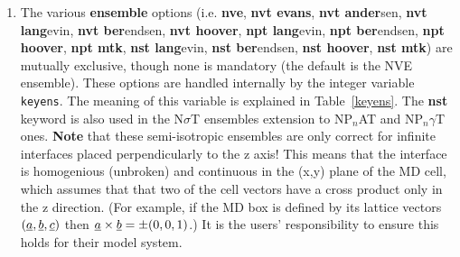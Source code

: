 \begin{enumerate}
\item The various {\bf ensemble} options (i.e.
{\bf nve},
{\bf nvt evans},
{\bf nvt ander}sen,
{\bf nvt lang}evin,
{\bf nvt ber}endsen,
{\bf nvt hoover},
{\bf npt lang}evin,
{\bf npt ber}endsen,
{\bf npt hoover},
{\bf npt mtk},
{\bf nst lang}evin,
{\bf nst ber}endsen,
{\bf nst hoover},
{\bf nst mtk})
are mutually exclusive, though none is mandatory (the default is
the NVE ensemble).  These options are handled
internally by the integer variable {\tt keyens}.  The meaning of
this variable is explained in Table~\ref{keyens}.  The {\bf nst}
keyword is also used in the N$\sigma$T ensembles extension to
NP$_{n}$AT and NP$_{n}\gamma$T ones.  {\bf Note} that
these semi-isotropic ensembles are only correct for infinite
interfaces placed perpendicularly to the z axis!  This means
that the interface is homogenious (unbroken) and continuous
in the (x,y) plane of the MD cell, which assumes that that two
of the cell vectors have a cross product only in the z
direction.  (For example, if the MD box is defined by
its lattice vectors $(\mbox{$\underline{a}$},\mbox{$\underline{b}$},\mbox{$\underline{c}$})$ then
$\mbox{$\underline{a}$} \times \mbox{$\underline{b}$} = \pm (0,0,1)$.)
It is the users' responsibility to ensure this holds for
their model system.


\end{enumerate}
